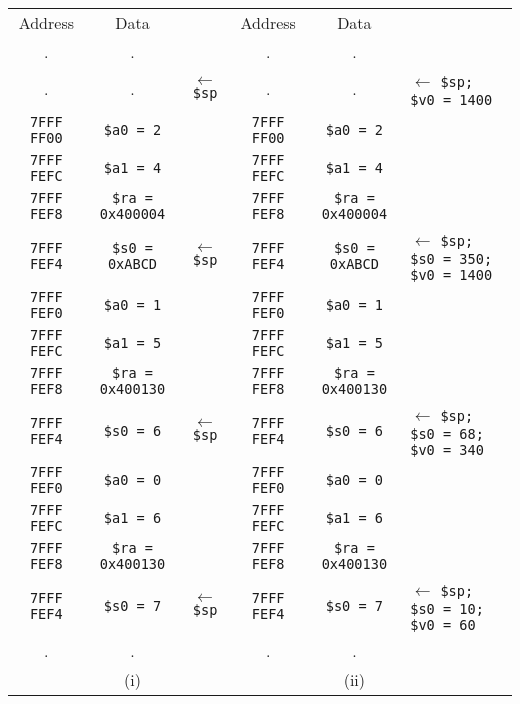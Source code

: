 \documentclass[12pt]{article}
\begin{document}
\begin{enumerate}
        \begin{table}[h!]
            \small
            \setlength\tabcolsep{2pt}
            \centering
            \begin{tabular}{c|c|c|c|c|c}
                Address & Data & & Address & Data & \\
                . & . & & . & . & \\
                . & . & $\leftarrow$ \texttt{\$sp} & . & . & \multicolumn{1}{l}{$\leftarrow$ \texttt{\$sp; \$v0 = 1400}} \\
                \hline
                \texttt{7FFF FF00} & \texttt{\$a0 = 2} & & \texttt{7FFF FF00} & \texttt{\$a0 = 2} & \\
                \texttt{7FFF FEFC} & \texttt{\$a1 = 4} & & \texttt{7FFF FEFC} & \texttt{\$a1 = 4} & \\
                \texttt{7FFF FEF8} & \texttt{\$ra = 0x400004} & & \texttt{7FFF FEF8} & \texttt{\$ra = 0x400004} & \\
                \texttt{7FFF FEF4} & \texttt{\$s0 = 0xABCD} & $\leftarrow$ \texttt{\$sp} & \texttt{7FFF FEF4} & \texttt{\$s0 = 0xABCD} & \multicolumn{1}{l}{$\leftarrow$ \texttt{\$sp; \$s0 = 350; \$v0 = 1400}} \\
                \hline
                \texttt{7FFF FEF0} & \texttt{\$a0 = 1} & & \texttt{7FFF FEF0} & \texttt{\$a0 = 1} & \\
                \texttt{7FFF FEFC} & \texttt{\$a1 = 5} & & \texttt{7FFF FEFC} & \texttt{\$a1 = 5} & \\
                \texttt{7FFF FEF8} & \texttt{\$ra = 0x400130} & & \texttt{7FFF FEF8} & \texttt{\$ra = 0x400130} & \\
                \texttt{7FFF FEF4} & \texttt{\$s0 = 6} & $\leftarrow$ \texttt{\$sp} & \texttt{7FFF FEF4} & \texttt{\$s0 = 6} & \multicolumn{1}{l}{$\leftarrow$ \texttt{\$sp; \$s0 = 68; \$v0 = 340}} \\
                \hline
                \texttt{7FFF FEF0} & \texttt{\$a0 = 0} & & \texttt{7FFF FEF0} & \texttt{\$a0 = 0} & \\
                \texttt{7FFF FEFC} & \texttt{\$a1 = 6} & & \texttt{7FFF FEFC} & \texttt{\$a1 = 6} & \\
                \texttt{7FFF FEF8} & \texttt{\$ra = 0x400130} & & \texttt{7FFF FEF8} & \texttt{\$ra = 0x400130} & \\
                \texttt{7FFF FEF4} & \texttt{\$s0 = 7} & $\leftarrow$ \texttt{\$sp} & \texttt{7FFF FEF4} & \texttt{\$s0 = 7} & \multicolumn{1}{l}{$\leftarrow$ \texttt{\$sp; \$s0 = 10; \$v0 = 60}} \\
                \hline
                . & . & & . & . & \\
                & (i) & & & (ii) & \\
            \end{tabular}
        \end{table}
    \end{enumerate}
\end{document}

